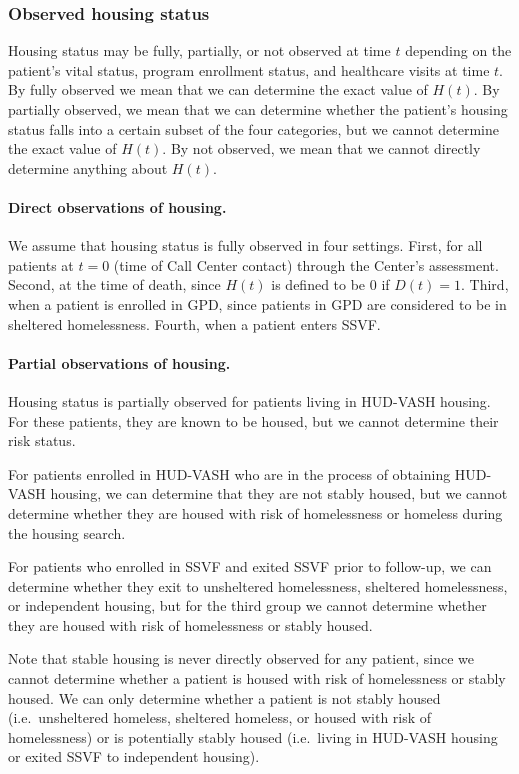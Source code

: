 \subsubsection{Observed housing status}
Housing status may be fully, partially, or not observed at time $t$ depending on the patient's vital status, program enrollment status, and healthcare visits at time $t$. By fully observed we mean that we can determine the exact value of $H(t)$. By partially observed, we mean that we can determine whether the patient's housing status falls into a certain subset of the four categories, but we cannot determine the exact value of $H(t)$. By not observed, we mean that we cannot directly determine anything about $H(t)$.

\paragraph{Direct observations of housing.} We assume that housing status is fully observed in four settings. First, for all patients at $t=0$ (time of Call Center contact) through the Center's assessment. Second, at the time of death, since $H(t)$ is defined to be $0$ if $D(t)=1$. Third, when a patient is enrolled in GPD, since patients in GPD are considered to be in sheltered homelessness. Fourth, when a patient enters SSVF.

\paragraph{Partial observations of housing.}
Housing status is partially observed for patients living in HUD-VASH housing. For these patients, they are known to be housed, but we cannot determine their risk status.

For patients enrolled in HUD-VASH who are in the process of obtaining HUD-VASH housing, we can determine that they are not stably housed, but we cannot determine whether they are housed with risk of homelessness or homeless during the housing search.

For patients who enrolled in SSVF and exited SSVF prior to follow-up, we can determine whether they exit to unsheltered homelessness, sheltered homelessness, or independent housing, but for the third group we cannot determine whether they are housed with risk of homelessness or stably housed.

Note that stable housing is never directly observed for any patient, since we cannot determine whether a patient is housed with risk of homelessness or stably housed. We can only determine whether a patient is not stably housed (i.e.\ unsheltered homeless, sheltered homeless, or housed with risk of homelessness) or is potentially stably housed (i.e.\ living in HUD-VASH housing or exited SSVF to independent housing).


